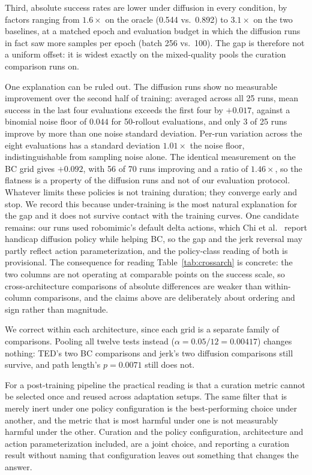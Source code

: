\documentclass{article}
\begin{document}
Third, absolute success rates are lower under diffusion in every condition,
by factors ranging from $1.6\times$ on the oracle (0.544 vs.\ 0.892) to
$3.1\times$ on the two baselines, at a matched epoch and evaluation budget
in which the diffusion runs in fact saw more samples per epoch (batch 256
vs.\ 100). The gap is therefore not a uniform offset: it is widest exactly
on the mixed-quality pools the curation comparison runs on.

One explanation can be ruled out. The diffusion runs show no measurable
improvement over the second half of training: averaged across all 25 runs,
mean success in the last four evaluations exceeds the first four by
$+0.017$, against a binomial noise floor of $0.044$ for 50-rollout
evaluations, and only 3 of 25 runs improve by more than one noise standard
deviation. Per-run variation across the eight evaluations has a standard
deviation $1.01\times$ the noise floor, indistinguishable from sampling
noise alone. The identical measurement on the BC grid gives $+0.092$, with
56 of 70 runs improving and a ratio of $1.46\times$, so the flatness is a
property of the diffusion runs and not of our evaluation protocol. Whatever
limits these policies is not training duration; they converge early and
stop. We record this because under-training is the most natural explanation
for the gap and it does not survive contact with the training curves. One
candidate remains: our runs used robomimic's default delta actions, which
Chi et al.~\citep{chi-dp} report handicap diffusion policy while helping BC,
so the gap and the jerk reversal may partly reflect action parameterization,
and the policy-class reading of both is provisional. The
consequence for reading
Table~\ref{tab:crossarch} is concrete: the two columns are not operating at
comparable points on the success scale, so cross-architecture comparisons of
absolute differences are weaker than within-column comparisons, and the
claims above are deliberately about ordering and sign rather than magnitude.

We correct within each architecture, since each grid is a separate family of
comparisons. Pooling all twelve tests instead ($\alpha = 0.05/12 = 0.00417$)
changes nothing: TED's two BC comparisons and jerk's two diffusion
comparisons still survive, and path length's $p = 0.0071$ still does not.

For a post-training pipeline the practical reading is that a curation metric
cannot be selected once and reused across adaptation setups. The same filter
that is merely inert under one policy configuration is the best-performing
choice under another, and the metric that is most harmful under one is not
measurably harmful under the other. Curation and the policy configuration,
architecture and action parameterization included, are a joint choice, and
reporting a curation result without naming that configuration leaves out
something that changes the answer.
\end{document}
